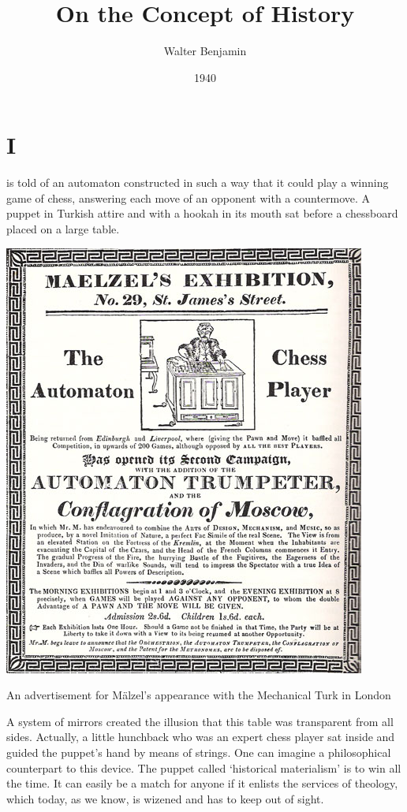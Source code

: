 \documentclass[12pt]{tufte-handout}
\title{On the Concept of History}
\author{Walter Benjamin}
\date{1940}  %
\begin{document}
\maketitle%


\section{I}\label{sec:I}

 is told of an automaton constructed in such a way that it could play a winning game of chess, answering each move of an opponent with a countermove. A puppet in Turkish attire and with a hookah in its mouth sat before a chessboard placed on a large table.\begin{marginfigure}%
\includegraphics[width=\linewidth]{graphics/Henkin12.jpg}
  \caption{An advertisement for M\"alzel's appearance with the Mechanical Turk in London}
  \label{fig:turk}
\end{marginfigure}
A system of mirrors created the illusion that this table was transparent from all sides. Actually, a little hunchback who was an expert chess player sat inside and guided the puppet’s hand by means of strings. One can imagine a philosophical counterpart to this device. The puppet called ‘historical materialism’ is to win all the time. It can easily be a match for anyone if it enlists the services of theology, which today, as we know, is wizened and has to keep out of sight. 	
\end{document}
